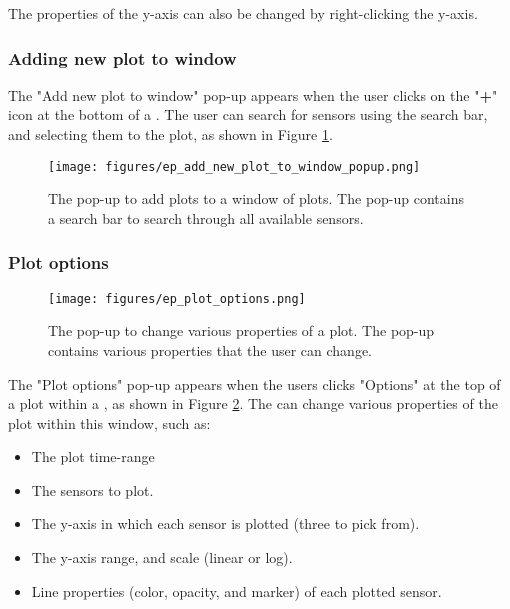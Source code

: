 \documentclass{article}
\begin{document}
The properties of the y-axis can also be changed by right-clicking the y-axis.

\newpage

\subsubsection{Adding new plot to window}
\label{sec:Add_new_plot_to_window}
The "Add new plot to window" pop-up appears when the user clicks on the "\textbf{+}" icon at the bottom of a \textbf{}. The user can search for sensors using the search bar, and selecting them to the plot, as shown in Figure \ref{fig:ep_add_new_plot_to_window_popup}.

\begin{figure} [h]
    \centering
    \texttt{[image: figures/ep\_add\_new\_plot\_to\_window\_popup.png]}
    \caption{\label{fig:ep_add_new_plot_to_window_popup} The pop-up to add plots to a window of plots. The pop-up contains a search bar to search through all available sensors.}
\end{figure}

\newpage

\subsubsection{Plot options}
\begin{figure} [h]
    \centering
    \texttt{[image: figures/ep\_plot\_options.png]}
    \caption{\label{fig:ep_plot_options} The pop-up to change various properties of a plot. The pop-up contains various properties that the user can change.}
\end{figure}

\label{sec:Plot_options}
The "Plot options" pop-up appears when the users clicks "Options" at the top of a plot within a \textbf{}, as shown in Figure \ref{fig:ep_plot_options}. The can change various properties of the plot within this window, such as:

\begin{itemize}
    \item The plot time-range
    \item The sensors to plot.
    \item The y-axis in which each sensor is plotted (three to pick from).
    \item The y-axis range, and scale (linear or log).
    \item Line properties (color, opacity, and marker) of each plotted sensor.
\end{itemize}
\end{document}
